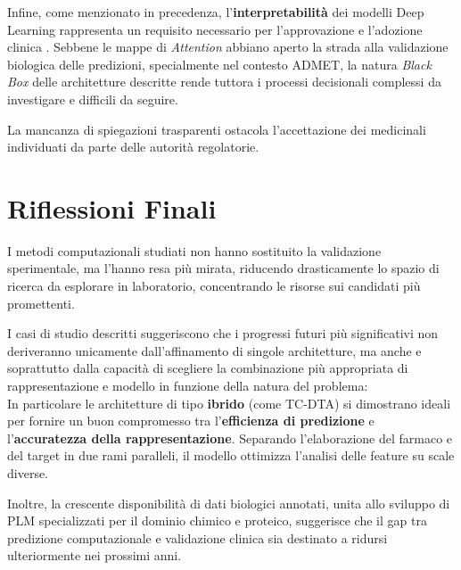 Infine, come menzionato in precedenza, l'\textbf{interpretabilità} dei modelli Deep Learning 
rappresenta un requisito necessario per l'approvazione e 
l'adozione clinica \cite{wangUnifiedSurveyDrugtarget2026a}. 
Sebbene le mappe di \textit{Attention} abbiano aperto la strada alla validazione biologica delle predizioni, specialmente nel contesto ADMET, la natura \textit{Black Box} delle architetture descritte rende tuttora i processi decisionali complessi da investigare e difficili da seguire.

La mancanza di spiegazioni trasparenti ostacola l'accettazione dei medicinali individuati da parte delle autorità regolatorie.

\section{Riflessioni Finali}
I metodi 
computazionali studiati non hanno sostituito la validazione 
sperimentale, ma l'hanno resa più mirata, riducendo 
drasticamente lo spazio di ricerca da esplorare in 
laboratorio, concentrando le risorse sui candidati più promettenti.

I casi di studio descritti suggeriscono che i progressi 
futuri più significativi non deriveranno unicamente
dall'affinamento di singole architetture, ma anche e soprattutto dalla capacità di scegliere la combinazione più appropriata
di rappresentazione e modello in funzione della natura del problema:\\
In particolare le architetture di tipo \textbf{ibrido} (come TC-DTA) si dimostrano ideali per fornire un buon compromesso tra l'\textbf{efficienza di predizione} e l'\textbf{accuratezza della rappresentazione}. Separando l'elaborazione del farmaco e del target in due rami paralleli, il modello ottimizza l'analisi delle feature su scale diverse.

Inoltre, la crescente 
disponibilità di dati biologici annotati, unita 
allo sviluppo di PLM specializzati per il dominio 
chimico e proteico, suggerisce che il gap tra 
predizione computazionale e validazione clinica 
sia destinato a ridursi ulteriormente nei prossimi 
anni.

